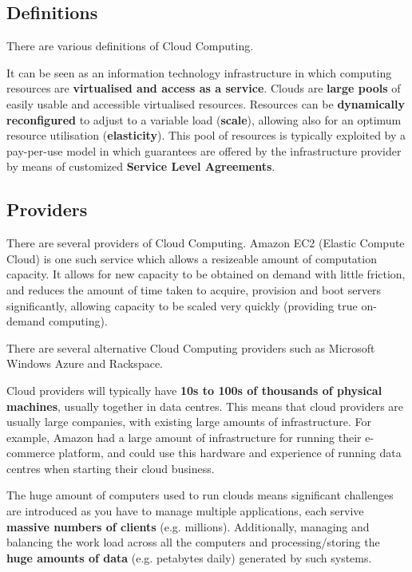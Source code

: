 \documentclass{article}
\begin{document}
\subsection{Definitions}

There are various definitions of Cloud Computing.

It can be seen as an information technology infrastructure in which computing resources are \textbf{virtualised and access as a service}. Clouds are \textbf{large pools} of easily usable and accessible virtualised resources. Resources can be \textbf{dynamically reconfigured} to adjust to a variable load (\textbf{scale}), allowing also for an optimum resource utilisation (\textbf{elasticity}). This pool of resources is typically exploited by a pay-per-use model in which guarantees are offered by the infrastructure provider by means of customized \textbf{Service Level Agreements}.

\subsection{Providers}

There are several providers of Cloud Computing. Amazon EC2 (Elastic Compute Cloud) is one such service which allows a resizeable amount of computation capacity. It allows for new capacity to be obtained on demand with little friction, and reduces the amount of time taken to acquire, provision and boot servers significantly, allowing capacity to be scaled very quickly (providing true on-demand computing). 

There are several alternative Cloud Computing providers such as Microsoft Windows Azure and Rackspace. 

Cloud providers will typically have \textbf{10s to 100s of thousands of physical machines}, usually together in data centres. This means that cloud providers are usually large companies, with existing large amounts of infrastructure. For example, Amazon had a large amount of infrastructure for running their e-commerce platform, and could use this hardware and experience of running data centres when starting their cloud business.

The huge amount of computers used to run clouds means significant challenges are introduced as you have to manage multiple applications, each servive \textbf{massive numbers of clients} (e.g. millions). Additionally, managing and balancing the work load across all the computers and processing/storing the \textbf{huge amounts of data} (e.g. petabytes daily) generated by such systems.
\end{document}
